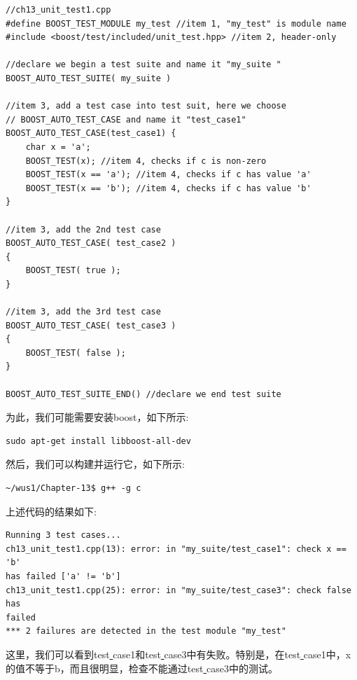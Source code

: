 \begin{lstlisting}[caption={}]
//ch13_unit_test1.cpp
#define BOOST_TEST_MODULE my_test //item 1, "my_test" is module name
#include <boost/test/included/unit_test.hpp> //item 2, header-only

//declare we begin a test suite and name it "my_suite "
BOOST_AUTO_TEST_SUITE( my_suite )

//item 3, add a test case into test suit, here we choose
// BOOST_AUTO_TEST_CASE and name it "test_case1"
BOOST_AUTO_TEST_CASE(test_case1) {
	char x = 'a';
	BOOST_TEST(x); //item 4, checks if c is non-zero
	BOOST_TEST(x == 'a'); //item 4, checks if c has value 'a'
	BOOST_TEST(x == 'b'); //item 4, checks if c has value 'b'
}

//item 3, add the 2nd test case
BOOST_AUTO_TEST_CASE( test_case2 )
{
	BOOST_TEST( true );
}

//item 3, add the 3rd test case
BOOST_AUTO_TEST_CASE( test_case3 )
{
	BOOST_TEST( false );
}

BOOST_AUTO_TEST_SUITE_END() //declare we end test suite
\end{lstlisting}

为此，我们可能需要安装boost，如下所示: \par

\begin{lstlisting}[caption={}]
sudo apt-get install libboost-all-dev
\end{lstlisting}

然后，我们可以构建并运行它，如下所示: \par

\begin{lstlisting}[caption={}]
~/wus1/Chapter-13$ g++ -g c
\end{lstlisting}

上述代码的结果如下: \par

\begin{lstlisting}[caption={}]
Running 3 test cases...
ch13_unit_test1.cpp(13): error: in "my_suite/test_case1": check x == 'b'
has failed ['a' != 'b']
ch13_unit_test1.cpp(25): error: in "my_suite/test_case3": check false has
failed
*** 2 failures are detected in the test module "my_test"
\end{lstlisting}

这里，我们可以看到test\underline{ }case1和test\underline{ }case3中有失败。特别是，在test\underline{ }case1中，x的值不等于b，而且很明显，检查不能通过test\underline{ }case3中的测试。 \par

